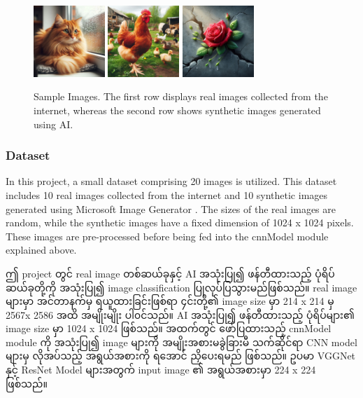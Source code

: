 \begin{figure}[h]
\includegraphics[width=0.24\textwidth]{imgs/cat.jpeg}
\includegraphics[width=0.24\textwidth]{imgs/chicken.jpeg}
\includegraphics[width=0.24\textwidth]{imgs/rose.jpeg}
\caption{Sample Images. The first row displays real images collected from the internet, whereas the second row shows synthetic images generated using AI.}\label{fig:p1R}
\end{figure}
\subsubsection{Dataset}
In this project, a small dataset comprising 20 images is utilized. This dataset includes 10 real images collected from the internet and 10 synthetic images generated using Microsoft Image Generator \cite{web:MSimgCreator}. The sizes of the real images are random, while the synthetic images have a fixed dimension of 1024 x 1024 pixels. These images are pre-processed before being fed into the cnnModel module explained above.

ဤ project တွင် real image တစ်ဆယ်ခုနှင့် AI အသုံးပြု၍ ဖန်တီထားသည့် ပုံရိပ် ဆယ်ခုတို့ကို အသုံးပြု၍ image classification ပြုလုပ်ပြသွားမည်ဖြစ်သည်။ real image များမှာ အင်တာနက်မှ ရယူထားခြင်းဖြစ်ရာ ၄င်းတို့၏ image size မှာ 214 x 214 မှ 2567x 2586 အထိ အမျိုးမျိုး ပါ၀င်သည်။ AI အသုံးပြု၍ ဖန်တီထားသည့် ပုံရိပ်များ၏ image size မှာ 1024 x 1024 ဖြစ်သည်။ အထက်တွင် ဖော်ပြထားသည့် cnnModel module ကို အသုံးပြု၍ image များကို အမျိုးအစားမခွဲခြားမီ သက်ဆိုင်ရာ CNN model များမှ လိုအပ်သည့် အရွယ်အစားကို ရအောင် ညှိပေးရမည် ဖြစ်သည်။ ဥပမာ  VGGNet နှင့် ResNet Model များအတွက် input image ၏ အရွယ်အစားမှာ 224 x 224 ဖြစ်သည်။ 

